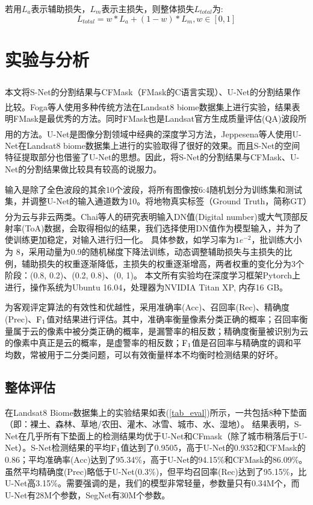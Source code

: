 \documentclass[10pt]{ctexart}
\newcommand{\upcite}[1]{\textsuperscript{\textsuperscript{\cite{#1}}}}
\begin{document}
\begin{multicols}{2}
若用$L_{a}$表示辅助损失，$L_{m}$表示主损失，则整体损失$L_{total}$为:
\begin{equation}
    L_{total}=w*L_{a}+(1-w)*L_{m}, w \in [0, 1]
\end{equation}
\section[]{实验与分析}

本文将S-Net的分割结果与CFMask（FMask\upcite{zhu2012object}的C语言实现）、U-Net\upcite{ronneberger2015unet}的分割结果作比较。Foga等人\upcite{foga2017cloud_data}使用多种传统方法在Landsat8 biome数据集上进行实验，结果表明FMask是最优秀的方法。同时FMask也是Landsat官方生成质量评估(QA)波段所用的方法。U-Net是图像分割领域中经典的深度学习方法，Jeppesena等人\upcite{jeppesen2019cloud}使用U-Net在Landsat8 biome数据集上进行的实验取得了很好的效果。而且S-Net的空间特征提取部分也借鉴了U-Net的思想。因此，将S-Net的分割结果与CFMask、U-Net的分割结果做比较具有较高的说服力。

输入是除了全色波段的其余10个波段，将所有图像按6:4随机划分为训练集和测试集，并调整U-Net的输入通道数为10。将地物真实标签（Ground Truth，简称GT）分为云与非云两类。Chai等人\upcite{chai2019cloud}的研究表明输入DN值(Digital number)或大气顶部反射率(ToA)数据，会取得相似的结果，我们选择使用DN值作为模型输入，并为了使训练更加稳定，对输入进行归一化。
具体参数，如学习率为$1e^{-2}$，批训练大小为 8，采用动量为0.9的随机梯度下降法训练，动态调整辅助损失与主损失的比例，辅助损失的权重逐渐降低，主损失的权重逐渐增高，两者权重的变化分为3个阶段：(0.8, 0.2)、(0.2, 0.8)、(0, 1)。
本文所有实验均在深度学习框架Pytorch上进行，操作系统为Ubuntu 16.04，处理器为NVIDIA Titan XP, 内存16 GB。

为客观评定算法的有效性和优越性，采用准确率(Acc)、召回率(Rec)、精确度(Prec)、$\rm F_1$值对结果进行评估。其中，准确率衡量像素分类正确的概率；召回率衡量属于云的像素中被分类正确的概率，是漏警率的相反数；精确度衡量被识别为云的像素中真正是云的概率，是虚警率的相反数；$\rm F_1$值是召回率与精确度的调和平均数，常被用于二分类问题，可以有效衡量样本不均衡时检测结果的好坏。

\subsection{整体评估}
在Landsat8 Biome数据集上的实验结果如表(\ref{tab_eval})所示，一共包括8种下垫面（即：裸土、森林、草地/农田、灌木、冰雪、城市、水、湿地）。
结果表明，S-Net在几乎所有下垫面上的检测结果均优于U-Net和CFmask（除了城市稍落后于U-Net）。S-Net检测结果的平均$\rm F_1$值达到了0.9505，高于U-Net的0.9352和CFMask的0.86；平均准确率(Acc)达到了95.34\%，高于U-Net的94.15\%和CFMask的86.09\%。虽然平均精确度(Prec)略低于U-Net(0.3\%)，但平均召回率(Rec)达到了95.15\%，比U-Net高3.15\%。需要强调的是，我们的模型非常轻量，参数量只有0.34M个，而U-Net有28M个参数，SegNet有30M个参数。

\end{multicols}
\end{document}
